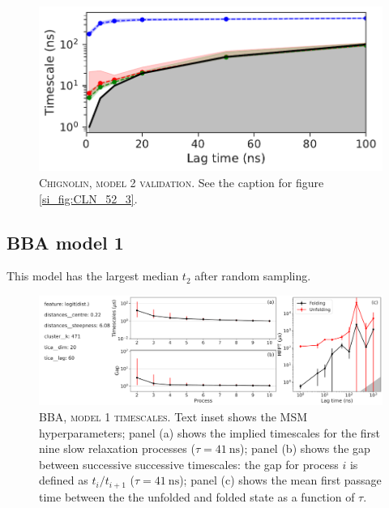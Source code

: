 \documentclass{article}
\begin{document}
\begin{figure}[h]
    \centering
    \includegraphics[height=0.15\textheight]{SI_figures/CLN_93_its.pdf}
    \caption{\textsc{Chignolin, model 2 validation}. See the caption for figure \ref{si_fig:CLN_52_3}.}
    \label{si_fig:CLN_93_3}
\end{figure}

\FloatBarrier
\clearpage


\subsection{BBA model 1}

This model has the largest median $t_{2}$ after random sampling.

\begin{figure}[h]
    \centering
    \includegraphics[width=\columnwidth]{SI_figures/BBA_24_SI-1.pdf}
    \caption{\textsc{BBA,  model 1 timescales.} Text inset shows the MSM hyperparameters; panel (a) shows the implied timescales for the first nine slow relaxation processes ($\tau=\SI{41}{\nano\second}$); panel (b) shows the gap between successive successive timescales: the gap for process $i$ is defined as $t_{i}/t_{i+1}$ ($\tau=\SI{41}{\nano\second}$); panel (c) shows the mean first passage time between the the unfolded and folded state as a function of $\tau$.}
    \label{si_fig:BBA_24_1}
\end{figure}
\end{document}
